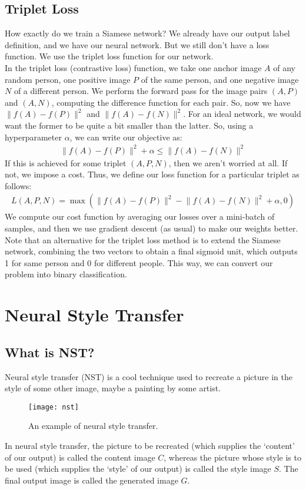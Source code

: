 \documentclass[a4paper, 12pt]{report}
\begin{document}
\section{Triplet Loss}
How exactly do we train a Siamese network? We already have our output label definition, and we have our neural network. But we still don't have a loss function. We use the triplet loss function for our network.\\
\break
In the triplet loss (contrastive loss) function, we take one anchor image $A$ of any random person, one positive image $P$ of the same person, and one negative image $N$ of a different person. We perform the forward pass for the image pairs $(A,P)$ and $(A,N)$, computing the difference function for each pair. So, now we have $\lVert f(A)-f(P)\rVert^2$ and $\lVert f(A)-f(N)\rVert^2$. For an ideal network, we would want the former to be quite a bit smaller than the latter. So, using a hyperparameter $\alpha$, we can write our objective as:
\begin{align*}
\lVert f(A)-f(P)\rVert^2 + \alpha \leq \lVert f(A)-f(N)\rVert^2
\end{align*}
If this is achieved for some triplet $(A,P,N)$, then we aren't worried at all. If not, we impose a cost. Thus, we define our loss function for a particular triplet as follows:
\begin{align*}
L(A,P,N)=\max\left(\lVert f(A)-f(P)\rVert^2 - \lVert f(A)-f(N)\rVert^2 + \alpha, 0\right)
\end{align*}
We compute our cost function by averaging our losses over a mini-batch of samples, and then we use gradient descent (as usual) to make our weights better.\\
\break
Note that an alternative for the triplet loss method is to extend the Siamese network, combining the two vectors to obtain a final sigmoid unit, which outputs 1 for same person and 0 for different people. This way, we can convert our problem into binary classification.

\chapter{Neural Style Transfer}

\section{What is NST?}
Neural style transfer (NST) is a cool technique used to recreate a picture in the style of some other image, maybe a painting by some artist.
\begin{figure}[H]
\centering
\texttt{[image: nst]}
\caption{An example of neural style transfer.}
\end{figure}
In neural style transfer, the picture to be recreated (which supplies the `content' of our output) is called the content image $C$, whereas the picture whose style is to be used (which supplies the `style' of our output) is called the style image $S$. The final output image is called the generated image $G$.
\end{document}
